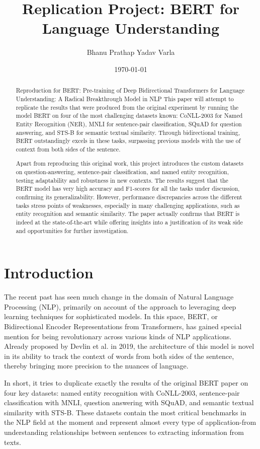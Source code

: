 \documentclass{article}
\title{Replication Project: BERT for Language Understanding}
\author{Bhanu Prathap Yadav Varla}
\date{\today}
\begin{document}
\maketitle

\begin{abstract}
Reproduction for BERT: Pre-training of Deep Bidirectional Transformers for Language Understanding: A Radical Breakthrough Model in NLP This paper will attempt to replicate the results that were produced from the original experiment by running the model BERT on four of the most challenging datasets known: CoNLL-2003 for Named Entity Recognition (NER), MNLI for sentence-pair classification, SQuAD for question answering, and STS-B for semantic textual similarity. Through bidirectional training, BERT outstandingly excels in these tasks, surpassing previous models with the use of context from both sides of the sentence.

Apart from reproducing this original work, this project introduces the custom datasets on question-answering, sentence-pair classification, and named entity recognition, testing adaptability and robustness in new contexts. The results suggest that the BERT model has very high accuracy and F1-scores for all the tasks under discussion, confirming its generalizability. However, performance discrepancies across the different tasks stress points of weaknesses, especially in many challenging applications, such as entity recognition and semantic similarity. The paper actually confirms that BERT is indeed at the state-of-the-art while offering insights into a justification of its weak side and opportunities for further investigation.
\end{abstract}

\section{Introduction}
The recent past has seen much change in the domain of Natural Language Processing (NLP), primarily on account of the approach to leveraging deep learning techniques for sophisticated models. In this space, BERT, or Bidirectional Encoder Representations from Transformers, has gained special mention for being revolutionary across various kinds of NLP applications. Already proposed by Devlin et al. in 2019, the architecture of this model is novel in its ability to track the context of words from both sides of the sentence, thereby bringing more precision to the nuances of language.

In short, it tries to duplicate exactly the results of the original BERT paper on four key datasets: named entity recognition with CoNLL-2003, sentence-pair classification with MNLI, question answering with SQuAD, and semantic textual similarity with STS-B. These datasets contain the most critical benchmarks in the NLP field at the moment and represent almost every type of application-from understanding relationships between sentences to extracting information from texts.
\end{document}
